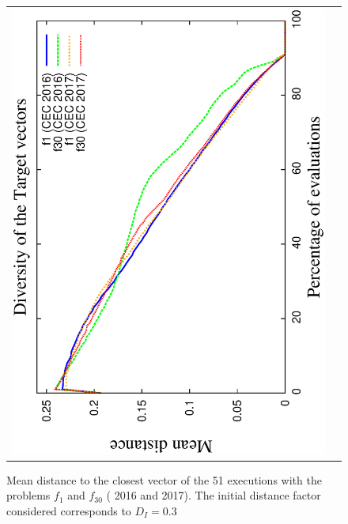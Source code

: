 \begin{figure}[t]
\begin{tabular}{cc}
   \includegraphics[scale=0.23, angle=-90]{img/Diversity_Target.eps} 
\end{tabular}
\caption{Mean distance to the closest vector of the 51 executions with the problems $f_1$ and $f_{30}$ (\CEC{} 2016 and \CEC{} 2017). The initial distance factor considered corresponds to $D_I=0.3$}
\label{fig:diversity}
\end{figure}



